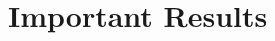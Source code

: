 \documentclass[10pt,handout]{beamer}%
\newcommand{\F}{\mathbb F}
\theoremstyle{definition}
\begin{document}
% 
% 
% 
% 
% 
% 
% 
% 
\section{Important Results}
\end{document}
